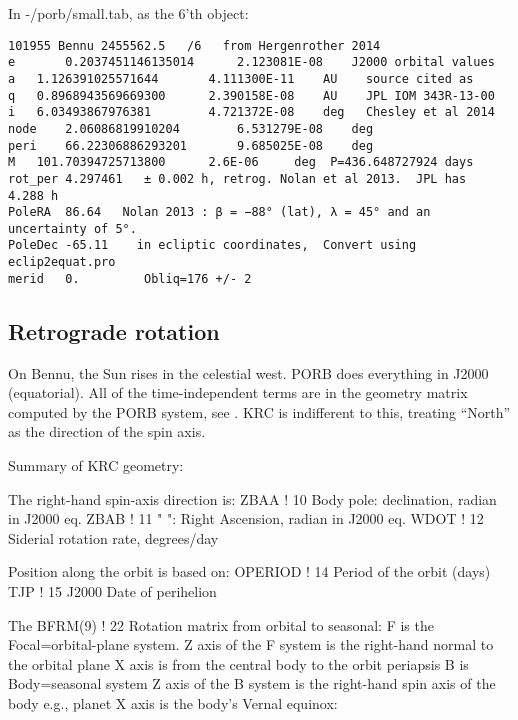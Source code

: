 \documentclass{article}
\begin{document}
In -/porb/small.tab, as the 6'th object: 
\vspace{-3.mm} 
\begin{verbatim}
101955 Bennu 2455562.5   /6   from Hergenrother 2014
e       0.2037451146135014      2.123081E-08    J2000 orbital values 
a 	1.126391025571644       4.111300E-11	AU    source cited as 
q 	0.8968943569669300      2.390158E-08 	AU    JPL IOM 343R-13-00
i 	6.03493867976381        4.721372E-08	deg   Chesley et al 2014
node 	2.06086819910204        6.531279E-08	deg    
peri    66.22306886293201       9.685025E-08	deg
M 	101.70394725713800      2.6E-06 	deg  P=436.648727924 days
rot_per 4.297461   ± 0.002 h, retrog. Nolan et al 2013.  JPL has  4.288 h 
PoleRA  86.64   Nolan 2013 : β = −88° (lat), λ = 45° and an uncertainty of 5°.  
PoleDec -65.11    in ecliptic coordinates,  Convert using eclip2equat.pro 
merid   0.         Obliq=176 +/- 2
\end{verbatim}


\subsection{Retrograde rotation}  %
On Bennu, the Sun rises in the celestial west. PORB does everything in J2000 (equatorial).  All of the time-independent terms are in the geometry matrix computed by the PORB system, see  . 
KRC is indifferent to this, treating ``North'' as the direction of the spin axis.

Summary of KRC geometry:

The right-hand spin-axis direction is: 
\qi ZBAA ! 10 Body pole: declination, radian in J2000 eq.
\qi ZBAB ! 11 " ": Right Ascension, radian in J2000 eq.
\qi WDOT ! 12 Siderial rotation rate, degrees/day

Position along the orbit is based on:
\qi OPERIOD ! 14 Period of the orbit (days)
\qi TJP ! 15 J2000 Date of perihelion

The BFRM(9) ! 22 Rotation matrix from orbital to seasonal:
\qi F is the Focal=orbital-plane system.
\qii Z axis of the F system is the right-hand normal to the orbital plane
\qii X axis is from the central body to the orbit periapsis
\qi B is Body=seasonal system
\qii Z axis of the B system is the right-hand spin axis of the body e.g., planet
\qii X axis is the body’s Vernal equinox: 
\end{document}
